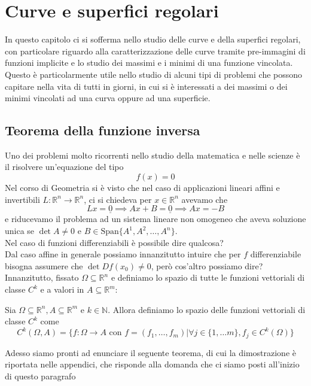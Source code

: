 \chapter{Curve e superfici regolari}
\pagestyle{plain}
\thispagestyle{empty}
\pagestyle{fancy}
\label{cap:curve_superfici_regolari}
In questo capitolo ci si sofferma nello studio delle curve e della superfici regolari, con particolare riguardo alla caratterizzazione delle curve tramite pre-immagini di funzioni implicite e lo studio dei massimi e i minimi di una funzione vincolata. Questo è particolarmente utile nello studio di alcuni tipi di problemi che possono capitare nella vita di tutti in giorni, in cui si è interessati a dei massimi o dei minimi vincolati ad una curva oppure ad una superficie.

\vspace{0.5cm}
\section{Teorema della funzione inversa}
Uno dei problemi molto ricorrenti nello studio della matematica e nelle scienze è il risolvere un'equazione del tipo
$$
f(x) = 0
$$
Nel corso di Geometria si è visto che nel caso di applicazioni lineari affini e invertibili $L: \mathbb{R}^n \to \mathbb{R}^n$, ci si chiedeva per $x \in \mathbb{R}^n$ avevamo che
$$
Lx = \underline{0} \implies Ax + B = \underline{0} \implies Ax = -B
$$
e riducevamo il problema ad un sistema lineare non omogeneo che aveva soluzione unica se $\det{A} \neq 0$ e $B \in \text{Span}\{ A^1, A^2, \ldots, A^n \}$. \\
Nel caso di funzioni differenziabili è possibile dire qualcosa? \\
Dal caso affine in generale possiamo innanzitutto intuire che per $f$ differenziabile bisogna assumere che $\det{Df(x_0)} \neq 0$, però cos'altro possiamo dire? \\
Innanzitutto, fissato $\Omega \subseteq \mathbb{R}^n$ e definiamo lo spazio di tutte le funzioni vettoriali di classe $C^k$ e a valori in $A \subseteq \mathbb{R}^m$:
\vspace{0.5cm}
\begin{definition}[\textcolor{blue}{Spazio delle funzioni vettoriali di classe $C^k$}]
Sia $\Omega \subseteq \mathbb{R}^n, A \subseteq \mathbb{R}^m$ e $k \in \mathbb{N}$. Allora definiamo lo spazio delle funzioni vettoriali di classe $C^k$ come
$$
C^k(\Omega,A) = \{f: \Omega \to A \text{ con } f = (f_1, \ldots, f_m) \big| \forall j \in \{1, \ldots m \}, f_j \in C^k(\Omega) \}
$$
\end{definition}
Adesso siamo pronti ad enunciare il seguente teorema, di cui la dimostrazione è riportata nelle appendici, che risponde alla domanda che ci siamo posti all'inizio di questo paragrafo 

